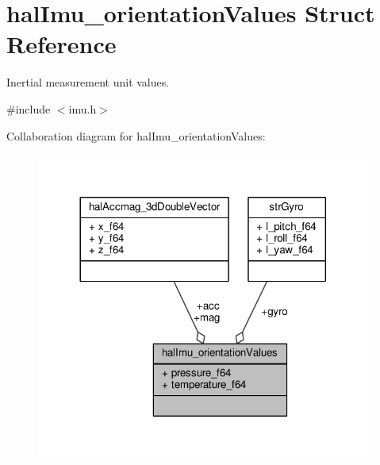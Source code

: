 \hypertarget{structhalImu__orientationValues}{\section{hal\+Imu\+\_\+orientation\+Values Struct Reference}
\label{structhalImu__orientationValues}
}


Inertial measurement unit values.  




{\ttfamily \#include $<$imu.\+h$>$}



Collaboration diagram for hal\+Imu\+\_\+orientation\+Values\+:
\nopagebreak
\begin{figure}[H]
\begin{center}
\leavevmode
\includegraphics[width=312pt]{structhalImu__orientationValues__coll__graph}
\end{center}
\end{figure}
